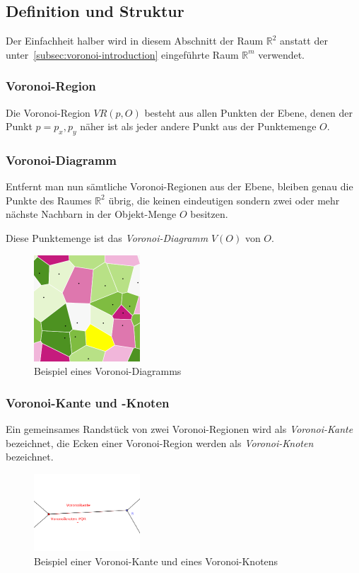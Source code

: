\subsection{Definition und Struktur}

Der Einfachheit halber wird in diesem Abschnitt der Raum $\mathbb{R}^2$ anstatt der unter~\ref{subsec:voronoi-introduction} eingeführte Raum $\mathbb{R}^m$ verwendet.

\subsubsection{Voronoi-Region}
Die Voronoi-Region $VR(p, O)$ besteht aus allen Punkten der Ebene, denen der Punkt $p = {p_x, p_y}$ näher ist als jeder andere Punkt aus der Punktemenge $O$.

\subsubsection{Voronoi-Diagramm}
Entfernt man nun sämtliche Voronoi-Regionen aus der Ebene, bleiben genau die Punkte des Raumes $\mathbb{R}^2$ übrig, die keinen eindeutigen sondern zwei oder mehr nächste Nachbarn in der Objekt-Menge $O$ besitzen.

Diese Punktemenge ist das \textit{Voronoi-Diagramm} $V(O)$ von $O$. \parencite{klein2005algorithmischegeometrie}

\begin{figure}[h]
\centering
\includegraphics[width=150px]{images/voronoi_example_01.png}
\caption{Beispiel eines Voronoi-Diagramms}
\label{fig:voronoiExample01}
\end{figure}

\subsubsection{Voronoi-Kante und -Knoten}
Ein gemeinsames Randstück von zwei Voronoi-Regionen wird als \textit{Voronoi-Kante} bezeichnet, die Ecken einer Voronoi-Region werden als \textit{Voronoi-Knoten} bezeichnet.

\begin{figure}[h]
\centering
\includegraphics[width=150px]{images/voronoi_kante_knoten.png}
\caption{Beispiel einer Voronoi-Kante und eines Voronoi-Knotens}
\label{fig:voronoiExample01}
\end{figure}
